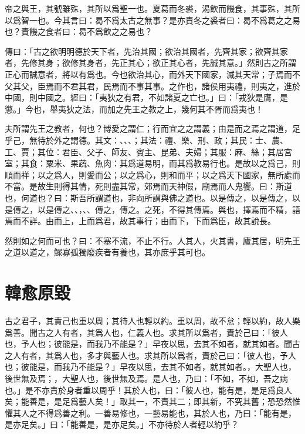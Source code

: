 帝之與王，其號雖殊，其所以爲聖一也。夏葛而冬裘，渴飲而饑食，其事殊，其所以爲智一也。今其言曰：曷不爲太古之無事？是亦責冬之裘者曰：曷不爲葛之之易也？責饑之食者曰：曷不爲飲之之易也？

傳曰：「古之欲明明德於天下者，先治其國；欲治其國者，先齊其家；欲齊其家者，先修其身；欲修其身者，先正其心；欲正其心者，先誠其意。」然則古之所謂正心而誠意者，將以有爲也。今也欲治其心，而外天下國家，滅其天常；子焉而不父其父，臣焉而不君其君，民焉而不事其事。之作也，諸侯用夷禮，則夷之，進於中國，則中國之。經曰：「夷狄之有君，不如諸夏之亡也。」曰：「戎狄是膺，是懲。」今也，舉夷狄之法，而加之先王之教之上，幾何其不胥而爲夷也！

夫所謂先王之教者，何也？博愛之謂仁；行而宜之之謂義；由是而之焉之謂道，足乎己，無待於外之謂德。其文：、、、；其法：禮、樂、刑、政；其民：士、農、工、賈；其位：君臣、父子、師友、賓主、昆弟、夫婦；其服：麻、絲；其居宮室；其食：粟米、果蔬、魚肉：其爲道易明，而其爲教易行也。是故以之爲己，則順而祥；以之爲人，則愛而公；以之爲心，則和而平；以之爲天下國家，無所處而不當。是故生則得其情，死則盡其常，郊焉而天神假，廟焉而人鬼饗。曰：斯道也，何道也？曰：斯吾所謂道也，非向所謂與佛之道也。以是傳之，以是傳之，以是傳之，以是傳之、、，、、傳之，傳之。之死，不得其傳焉。與也，擇焉而不精，語焉而不詳。由而上，上而爲君，故其事行；由而下，下而爲臣，故其說長。

然則如之何而可也？曰：不塞不流，不止不行。人其人，火其書，廬其居，明先王之道以道之，鰥寡孤獨廢疾者有養也，其亦庶乎其可也。

\section[原毀\quad{\small 韓愈}]{{\normalsize 韓愈}\quad 原毀}
古之君子，其責己也重以周；其待人也輕以約。重以周，故不怠；輕以約，故人樂爲善。聞古之人有者，其爲人也，仁義人也。求其所以爲者，責於己曰：「彼人也，予人也；彼能是，而我乃不能是？」早夜以思，去其不如者，就其如者。聞古之人有者，其爲人也，多才與藝人也。求其所以爲者，責於己曰：「彼人也，予人也；彼能是，而我乃不能是？」早夜以思，去其不如者，就其如者。，大聖人也，後世無及焉；，大聖人也，後世無及焉。是人也，乃曰：「不如，不如，吾之病也。」是不亦責於身者重以周乎！其於人也，曰：「彼人也，能有是，是足爲良人矣；能善是，是足爲藝人矣！」取其一，不責其二；即其新，不究其舊；恐恐然惟懼其人之不得爲善之利。一善易修也，一藝易能也，其於人也，乃曰：「能有是，是亦足矣。」曰：「能善是，是亦足矣。」不亦待於人者輕以約乎？

